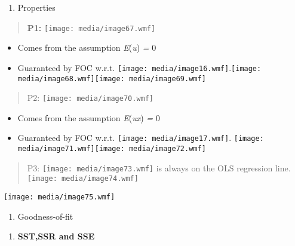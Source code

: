 \begin{enumerate}
\def\labelenumi{\arabic{enumi}.}
\setcounter{enumi}{1}
\item
  Properties
\end{enumerate}

\begin{quote}
\textbf{P1:} \texttt{[image: media/image67.wmf]}
\end{quote}

\begin{itemize}
\item
  Comes from the assumption \emph{E}(\emph{u}) \emph{=} 0
\item
  Guaranteed by FOC w.r.t.
  \texttt{[image: media/image16.wmf]}.\texttt{[image: media/image68.wmf]}\texttt{[image: media/image69.wmf]}
\end{itemize}

\begin{quote}
P2: \texttt{[image: media/image70.wmf]}
\end{quote}

\begin{itemize}
\item
  Comes from the assumption \emph{E}(\emph{u\textbar x}) \emph{=} 0
\item
  Guaranteed by FOC w.r.t. \texttt{[image: media/image17.wmf]}.
  \texttt{[image: media/image71.wmf]}\texttt{[image: media/image72.wmf]}
\end{itemize}

\begin{quote}
P3: \texttt{[image: media/image73.wmf]} is always on the OLS regression
line. \texttt{[image: media/image74.wmf]}
\end{quote}

\texttt{[image: media/image75.wmf]}

\begin{enumerate}
\def\labelenumi{\arabic{enumi}.}
\setcounter{enumi}{2}
\item
  Goodness-of-fit
\end{enumerate}

\begin{enumerate}
\def\labelenumi{\alph{enumi}.}
\item
  \textbf{SST,SSR and SSE}
\end{enumerate}

